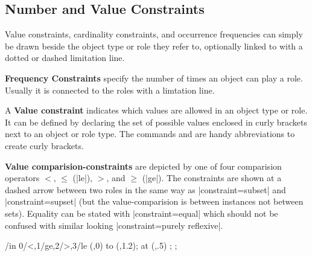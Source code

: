 \documentclass[a4paper,10pt]{article}
\begin{document}
\subsection{Number and Value Constraints}
Value constraints, cardinality constraints, and occurrence frequencies can simply be drawn beside the object type or role they refer to, optionally linked to with a dotted or dashed limitation line.

\noindent\textbf{Frequency Constraints} specify the number of times an object can play a role. Usually it is connected to the roles with a limtation line. %

\begin{codeexample}[width=3cm]
\end{codeexample}

\noindent A \textbf{Value constraint} indicates which values are allowed in an object type or role. It can be defined by declaring the set of possible values enclosed in curly brackets next to an object or role type. The commands  and  are handy abbreviations to create curly brackets.

\begin{codeexample}[]
\end{codeexample}

\noindent\textbf{Value comparision-constraints} are depicted by one of four comparision operators $<$, $\le$ (|le|), $>$, and $\ge$ (|ge|). The constraints are shown at a dashed arrow between two roles in the same way as |constraint=subset| and |constraint=supset| (but the value-comparision is between instances not between sets). Equality can be stated with |constraint=equal| which should not be confused with similar looking |constraint=purely reflexive|.

\begin{codeexample}[]
\tikz \foreach \x/\s in {0/<,1/ge,2/>,3/le}{
  \draw[limits to] (\x,0) to (\x,1.2);
  \node[constraint=\s] at (\x,.5) {};
};
\end{codeexample}
\end{document}
